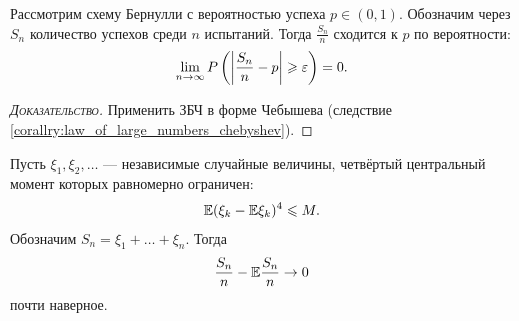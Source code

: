 \documentclass[../main.tex]{subfiles}
\begin{document}
\begin{crly}
 Рассмотрим схему Бернулли с вероятностью успеха $ p \in (0,1) $. Обозначим через $ S_n $ количество успехов среди $ n $ испытаний. Тогда $ \frac{S_n}{n} $ сходится к $ p $ по вероятности:
 \begin{align*}
  \lim_{n \to \infty} P \left( \left| \frac{S_n}{n} - p \right| \geqslant \varepsilon \right) = 0.
 \end{align*}
\end{crly}
\begin{proof}[\normalfont\textsc{Доказательство}]
 Применить ЗБЧ в форме Чебышева (следствие \ref{corallry:law_of_large_numbers_chebyshev}).
\end{proof}

\begin{thm}
 \label{theorem:strong_law_of_large_numbers}
 Пусть $ \xi_1,\xi_2, \ldots $ --- независимые случайные величины, четвёртый центральный момент которых равномерно ограничен:
 \begin{align*}
  \mathbb E (\xi_k-\mathbb E\xi_k)^{4} \leqslant M.
 \end{align*} Обозначим $ S_n = \xi_1 + \ldots + \xi_n $. Тогда
 \begin{align*}
  \frac{S_n}{n} - \mathbb E \frac{S_n}{n} \to 0
 \end{align*} почти наверное.
\end{thm}
\end{document}
